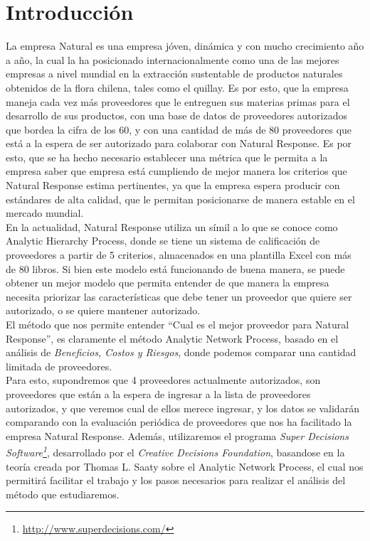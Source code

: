 \documentclass[12pt,letterpaper]{article}
\begin{document}
\section{Introducción}
La empresa Natural es una empresa jóven, dinámica y con mucho crecimiento año a año, la cual la ha posicionado internacionalmente como una de las mejores empresas a nivel mundial en la extracción sustentable de productos naturales obtenidos de la flora chilena, tales como el quillay. Es por esto, que la empresa maneja cada vez más proveedores que le entreguen sus materias primas para el desarrollo de sus productos, con una base de datos de proveedores autorizados que bordea la cifra de los 60, y con una cantidad de más de 80 proveedores que está a la espera de ser autorizado para colaborar con Natural Response. Es por esto, que se ha hecho necesario establecer una métrica que le permita a la empresa saber que empresa está cumpliendo de mejor manera los criterios que Natural Response estima pertinentes, ya que la empresa espera producir con estándares de alta calidad, que le permitan posicionarse de manera estable en el mercado mundial.\\

En la actualidad, Natural Response utiliza un símil a lo que se conoce como Analytic Hierarchy Process, donde se tiene un sistema de calificación de proveedores a partir de 5 criterios, almacenados en una plantilla Excel con más de 80 libros. Si bien este modelo está funcionando de buena manera, se puede obtener un mejor modelo que permita entender de que manera la empresa necesita priorizar las características que debe tener un proveedor que quiere ser autorizado, o se quiere mantener autorizado.\\

El método que nos permite entender ``Cual es el mejor proveedor para Natural Response'', es claramente el método Analytic Network Process, basado en el análisis de \textit{Beneficios, Costos y Riesgos}, donde podemos comparar una cantidad limitada de proveedores.\\
Para esto, supondremos que 4 proveedores actualmente autorizados, son proveedores que están a la espera de ingresar a la lista de proveedores autorizados, y que veremos cual de ellos merece ingresar, y los datos se validarán comparando con la evaluación periódica de proveedores que nos ha facilitado la empresa Natural Response. Además, utilizaremos el programa \textit{Super Decisions Software\footnote{\url{http://www.superdecisions.com/}}}, desarrollado por el \textit{Creative Decisions Foundation}, basandose en la teoría creada por Thomas L. Saaty sobre el Analytic Network Process, el cual nos permitirá facilitar el trabajo y los pasos necesarios para realizar el análisis del método que estudiaremos.
\newpage
\end{document}
